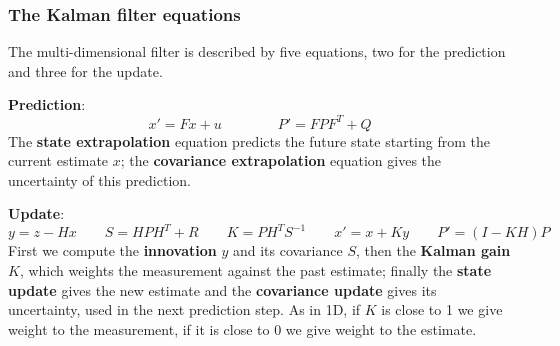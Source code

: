 \subsubsection{The Kalman filter equations}
The multi-dimensional filter is described by five equations, two for the prediction and three for the update.

\textbf{Prediction}:
\[
x' = Fx + u \qquad\qquad P' = FPF^T + Q
\]
The \textbf{state extrapolation} equation predicts the future state starting from the current estimate $x$; the \textbf{covariance extrapolation} equation gives the uncertainty of this prediction.

\textbf{Update}:
\[
y = z - Hx \qquad S = HPH^T + R \qquad K = PH^TS^{-1} \qquad x' = x + Ky \qquad P' = (I - KH)P
\]
First we compute the \textbf{innovation} $y$ and its covariance $S$, then the \textbf{Kalman gain} $K$, which weights the measurement against the past estimate; finally the \textbf{state update} gives the new estimate and the \textbf{covariance update} gives its uncertainty, used in the next prediction step.
As in 1D, if $K$ is close to 1 we give weight to the measurement, if it is close to 0 we give weight to the estimate.

